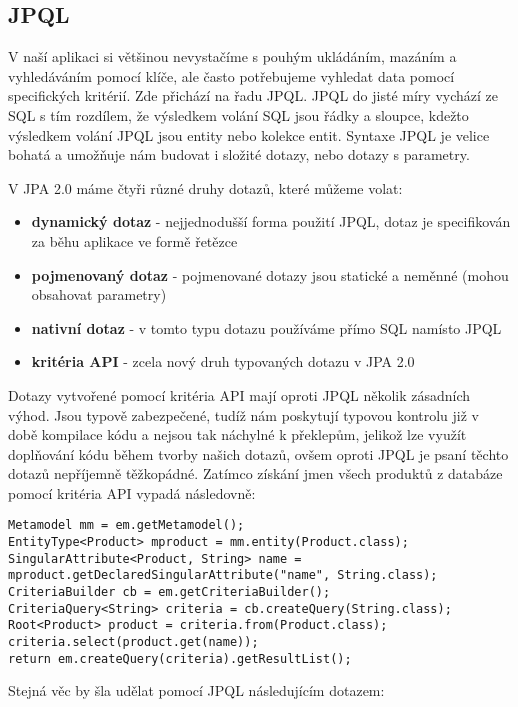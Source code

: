 \documentclass[122pt,oneside]{fithesis}
\begin{document}
\subsection{JPQL}

V naší aplikaci si většinou nevystačíme s pouhým ukládáním, mazáním a vyhledáváním pomocí klíče, ale často potřebujeme vyhledat data pomocí specifických kritérií. Zde přichází na řadu JPQL. JPQL do jisté míry vychází ze SQL s tím rozdílem, že výsledkem volání SQL jsou řádky a sloupce, kdežto výsledkem volání JPQL jsou entity nebo kolekce entit. Syntaxe JPQL je velice bohatá a umožňuje nám budovat i složité dotazy, nebo dotazy s parametry. 

V JPA 2.0 máme čtyři různé druhy dotazů, které můžeme volat:
\begin{itemize}
  \item {\bf dynamický dotaz} - nejjednodušší forma použití JPQL, dotaz je specifikován za běhu aplikace ve formě řetězce
  \item {\bf pojmenovaný dotaz} - pojmenované dotazy jsou statické a neměnné (mohou obsahovat parametry)
  \item {\bf nativní dotaz} - v tomto typu dotazu používáme přímo SQL namísto JPQL
  \item {\bf kritéria API} - zcela nový druh typovaných dotazu v JPA 2.0
\end{itemize}

Dotazy vytvořené pomocí kritéria API mají oproti JPQL několik zásadních výhod. Jsou typově zabezpečené, tudíž nám poskytují typovou kontrolu již v době kompilace kódu a nejsou tak náchylné k překlepům, jelikož lze využít doplňování kódu během tvorby našich dotazů, ovšem oproti JPQL je psaní těchto dotazů nepříjemně těžkopádné. Zatímco získání jmen všech produktů z databáze pomocí kritéria API vypadá následovně:

\begin{lstlisting}
Metamodel mm = em.getMetamodel();
EntityType<Product> mproduct = mm.entity(Product.class);
SingularAttribute<Product, String> name = mproduct.getDeclaredSingularAttribute("name", String.class);
CriteriaBuilder cb = em.getCriteriaBuilder();
CriteriaQuery<String> criteria = cb.createQuery(String.class);
Root<Product> product = criteria.from(Product.class);
criteria.select(product.get(name));
return em.createQuery(criteria).getResultList();
\end{lstlisting}

Stejná věc by šla udělat pomocí JPQL následujícím dotazem:
\end{document}
